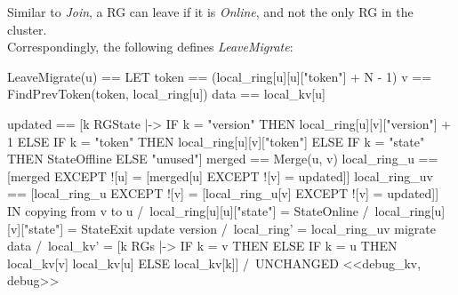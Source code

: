 Similar to \textit{Join}, a RG can leave if it is \textit{Online}, and not the
only RG in the cluster.\\

Correspondingly, the following defines \textit{LeaveMigrate}:\\
\begin{tla}
LeaveMigrate(u) == 
    LET 
        token == (local_ring[u][u]["token"] + N - 1) %
        v == FindPrevToken(token, local_ring[u])
        data == local_kv[u] 

        updated == [k \in RGState |-> 
                            IF k = "version" THEN local_ring[u][v]["version"] + 1
                            ELSE IF k = "token" THEN local_ring[u][v]["token"]
                            ELSE IF k = "state" THEN StateOffline
                            ELSE "unused"]
        merged == Merge(u, v)
        local_ring_u == [merged EXCEPT ![u] 
                            = [merged[u] EXCEPT ![v] = updated]]
        local_ring_uv == [local_ring_u EXCEPT ![v] 
                            = [local_ring_u[v] EXCEPT ![v] = updated]]
    IN 
        \* copying from v to u
        /\ local_ring[u][u]["state"] = StateOnline
        /\ local_ring[u][v]["state"] = StateExit
        \* update version 
        /\ local_ring' = local_ring_uv
        \* migrate data
        /\ local_kv' = [k \in RGs |-> 
                        IF k = v THEN {} 
                        ELSE IF k = u THEN local_kv[v] \cup local_kv[u] 
                        ELSE local_kv[k]]
        /\ UNCHANGED <<debug_kv, debug>>
\end{tla}
